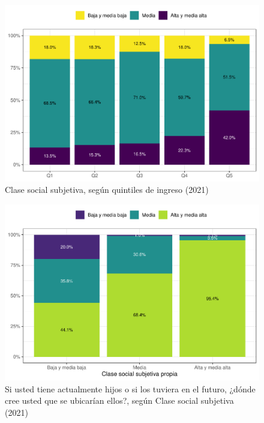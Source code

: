\documentclass[
  12pt,
]{book}
\begin{document}
\begin{figure}

{\centering \includegraphics{reporte-elsoc_files/figure-latex/ess-quintil-1} 

}

\caption{Clase social subjetiva, según quintiles de ingreso (2021)}\label{fig:ess-quintil}
\end{figure}

\begin{figure}

{\centering \includegraphics{reporte-elsoc_files/figure-latex/esshijos-ess-1} 

}

\caption{Si usted tiene actualmente hijos o si los tuviera en el futuro, ¿dónde cree usted que se ubicarían ellos?, según Clase social subjetiva (2021)}\label{fig:esshijos-ess}
\end{figure}
\end{document}
